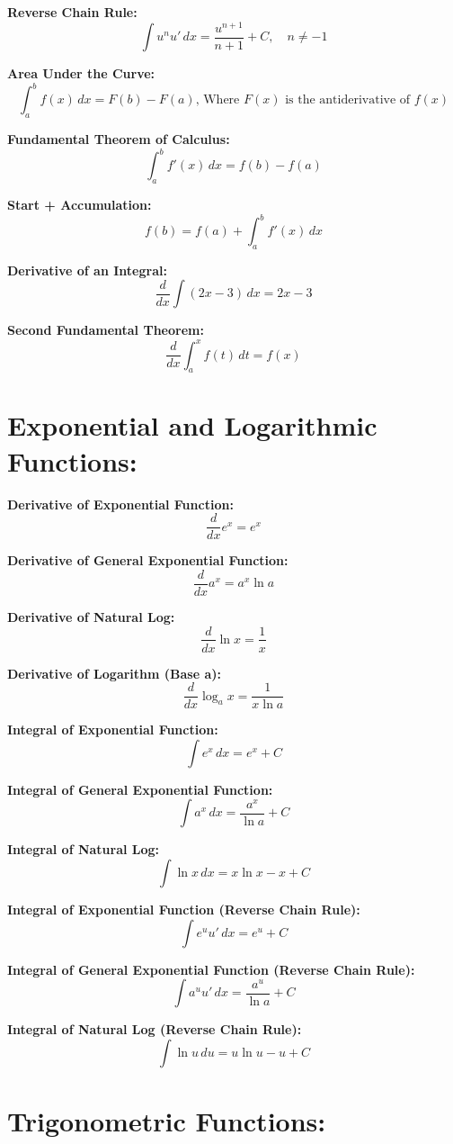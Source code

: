 \documentclass{article}
\begin{document}
\textbf{Reverse Chain Rule:}
\[
\int u^n u' \, dx = \frac{u^{n+1}}{n+1} + C, \quad n \neq -1
\]

\textbf{Area Under the Curve:}
\[
\int_{a}^{b} f(x) \, dx = F(b) - F(a) \text{, Where } F(x) \text{ is the antiderivative of } f(x)
\]

\textbf{Fundamental Theorem of Calculus:}
\[
\int_{a}^{b} f'(x) \, dx = f(b) - f(a)
\]

\textbf{Start + Accumulation:}
\[
f(b) = f(a) + \int_{a}^{b} f'(x) \, dx
\]

\textbf{Derivative of an Integral:}
\[
\frac{d}{dx} \int (2x-3)\, dx = 2x-3
\]

\textbf{Second Fundamental Theorem:}
\[
\frac{d}{dx} \int_{a}^{x} f(t) \, dt = f(x)
\]

\section*{\textbf{Exponential and Logarithmic Functions:}}

\textbf{Derivative of Exponential Function:}
\[
\frac{d}{dx} e^x = e^x
\]

\textbf{Derivative of General Exponential Function:}
\[
\frac{d}{dx} a^x = a^x \ln a
\]

\textbf{Derivative of Natural Log:}
\[
\frac{d}{dx} \ln x = \frac{1}{x}
\]

\textbf{Derivative of Logarithm (Base a):}
\[
\frac{d}{dx} \log_a x = \frac{1}{x \ln a}
\]

\textbf{Integral of Exponential Function:}
\[
\int e^x \, dx = e^x + C
\]

\textbf{Integral of General Exponential Function:}
\[
\int a^x \, dx = \frac{a^x}{\ln a} + C
\]

\textbf{Integral of Natural Log:}
\[
\int \ln x \, dx = x \ln x - x + C
\]

\textbf{Integral of Exponential Function (Reverse Chain Rule):}
\[
\int e^{u} u' \, dx = e^{u} + C
\]

\textbf{Integral of General Exponential Function (Reverse Chain Rule):}
\[
\int a^{u} u' \, dx = \frac{a^{u}}{\ln a} + C
\]

\textbf{Integral of Natural Log (Reverse Chain Rule):}
\[
\int \ln u \, du = u \ln u - u + C
\]

\section*{\textbf{Trigonometric Functions:}}
\end{document}
